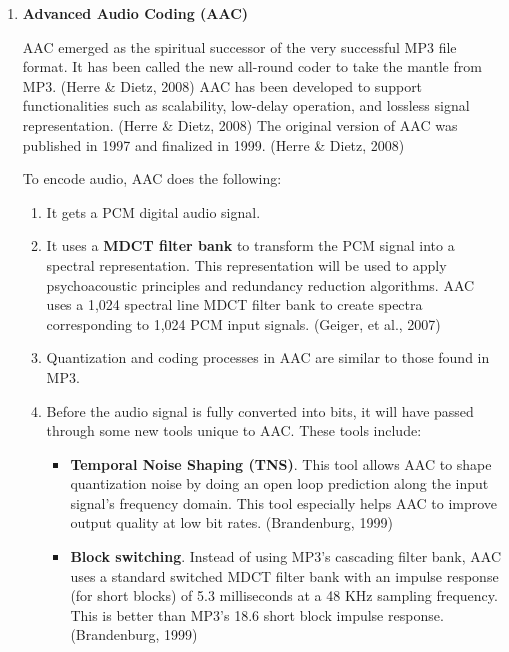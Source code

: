 \documentclass[12pt,svgnames,smaller]{article} %
\begin{document}
\begin{enumerate}
		
		\item \textbf{ Advanced Audio Coding (AAC)}
		
		AAC emerged as the spiritual successor of the very successful MP3 file format. It has been called the new all-round coder to take the mantle from MP3. (Herre \& Dietz, 2008) AAC has been developed to support functionalities such as scalability, low-delay operation, and lossless signal representation. (Herre \& Dietz, 2008) The original version of AAC was published in 1997 and finalized in 1999. (Herre \& Dietz, 2008)
		
		To encode audio, AAC does the following:
		
		\begin{enumerate}
			\item It gets a PCM digital audio signal. 
			\item It uses a \textbf{MDCT filter bank} to transform the PCM signal into a spectral representation. This representation will be used to apply psychoacoustic principles and redundancy reduction algorithms. AAC uses a 1,024 spectral line MDCT filter bank to create spectra corresponding to 1,024 PCM input signals. (Geiger, et al., 2007)
			\item Quantization and coding processes in AAC are similar to those found in MP3. 
			\item  Before the audio signal is fully converted into bits, it will have passed through some new tools unique to AAC. These tools include:
			
			\begin{itemize}
				\item \textbf{Temporal Noise Shaping (TNS)}. This tool allows AAC to shape quantization noise by doing an open loop prediction along the input signal’s frequency domain. This tool especially helps AAC to improve output quality at low bit rates. (Brandenburg, 1999)
				\item \textbf{Block switching}. Instead of using MP3’s cascading filter bank, AAC uses a standard switched MDCT filter bank with an impulse response (for short blocks) of 5.3 milliseconds at a 48 KHz sampling frequency. This is better than MP3’s 18.6 short block impulse response. (Brandenburg, 1999)
			\end{itemize}
			
		\end{enumerate}
		

\end{enumerate}
\end{document}
